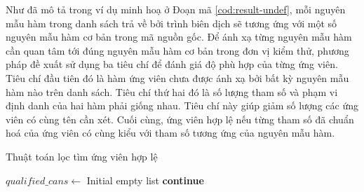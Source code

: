 Như đã mô tả trong ví dụ minh hoạ ở Đoạn mã \autoref{cod:result-undef}, mỗi nguyên mẫu hàm trong danh sách trả về bởi trình biên dịch sẽ tương ứng với một số nguyên mẫu hàm cơ bản trong mã nguồn gốc. Để ánh xạ từng nguyên mẫu hàm cần quan tâm tới đúng nguyên mẫu hàm cơ bản trong đơn vị kiểm thử, phương pháp đề xuất sử dụng ba tiêu chí để đánh giá độ phù hợp của từng ứng viên. Tiêu chí đầu tiên đó là hàm ứng viên chưa được ánh xạ bởi bất kỳ nguyên mẫu hàm nào trên danh sách. Tiêu chí thứ hai đó là số lượng tham số và phạm vi định danh của hai hàm phải giống nhau. Tiêu chí này giúp giảm số lượng các ứng viên có cùng tên cần xét. Cuối cùng, ứng viên hợp lệ nếu từng tham số đã chuẩn hoá của ứng viên có cùng kiểu với tham số tương ứng của nguyên mẫu hàm.
\begin{algorithm}
    \small
    \caption{Thuật toán lọc tìm ứng viên hợp lệ}
    \label{alg:filter-undef}
					
    $qualified\_cans \leftarrow$ Initial empty list\;
     {
         {
            \textbf{continue}
        }
    }
\end{algorithm}

